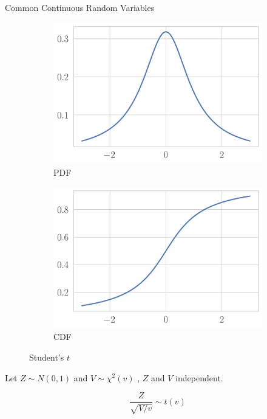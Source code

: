 \documentclass[11pt, xcolor={dvipsnames}, hyperref={colorlinks, allcolors=Blue}]{beamer}
\begin{document}

\begin{frame}{Common Continuous Random Variables}

\begin{figure}[t]
	\begin{subfigure}[b]{0.4\textwidth}
		\centering
		\includegraphics[width=\textwidth]{t_pdf.png}
		\caption*{PDF}
	\end{subfigure}
	\begin{subfigure}[b]{0.4\textwidth}
		\centering
		\includegraphics[width=\textwidth]{t_cdf.png}
		\caption*{CDF}
	\end{subfigure}
\caption{Student's $t$}
\end{figure}



Let $Z \sim N(0,1)$ and $V \sim \chi^{2}(v)$ , $Z$ and $V$ independent.	

\[ \frac{Z}{\sqrt{V/v}} \sim t(v)\]

\end{frame}
\end{document}
